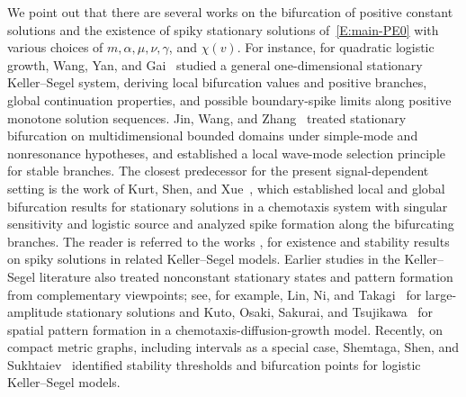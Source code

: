 \documentclass[11pt]{article} %
\theoremstyle{remark}
\theoremstyle{remark}
\numberwithin{equation}{section}
\numberwithin{figure}{section}
\numberwithin{table}{section}
\begin{document}
We point out that there are several works on the bifurcation of positive
constant solutions and the existence of spiky stationary solutions
of~\eqref{E:main-PE0} with various choices of $m, \alpha, \mu, \nu, \gamma$, and
$\chi(v)$. For instance, for quadratic logistic growth, Wang, Yan, and
Gai~\cite{wang.yan.ea:16:qualitative} studied a general one-dimensional
stationary Keller--Segel system, deriving local bifurcation values and positive
branches, global continuation properties, and possible boundary-spike limits
along positive monotone solution sequences. Jin, Wang, and
Zhang~\cite{jin.wang.ea:16:pattern} treated stationary bifurcation on
multidimensional bounded domains under simple-mode and nonresonance hypotheses,
and established a local wave-mode selection principle for stable branches. The
closest predecessor for the present signal-dependent setting is the work of
Kurt, Shen, and Xue~\cite{kurt.shen.ea:24:stability}, which established local
and global bifurcation results for stationary solutions in a chemotaxis system
with singular sensitivity and logistic source and analyzed spike formation along
the bifurcating branches. The reader is referred to the works
\cite{wang.xu:13:spiky, chen.hao.ea:14:stability, kong.ward.ea:24:existence,
kong.wei.ea:23:existence, wang.xu:22:radial, kong.wang:22:stability,
xu:21:existence, li:18:spiky}, for existence and stability results on spiky
solutions in related Keller--Segel models. Earlier studies in the Keller--Segel
literature also treated nonconstant stationary states and pattern formation from
complementary viewpoints; see, for example, Lin, Ni, and
Takagi~\cite{lin.ni.ea:88:large} for large-amplitude stationary solutions and
Kuto, Osaki, Sakurai, and Tsujikawa~\cite{kuto.osaki.ea:12:spatial} for spatial
pattern formation in a chemotaxis-diffusion-growth model. Recently, on compact
metric graphs, including intervals as a special case, Shemtaga, Shen, and
Sukhtaiev~\cite{shemtaga.shen.ea:23:stability} identified stability thresholds
and bifurcation points for logistic Keller--Segel models.
\end{document}
